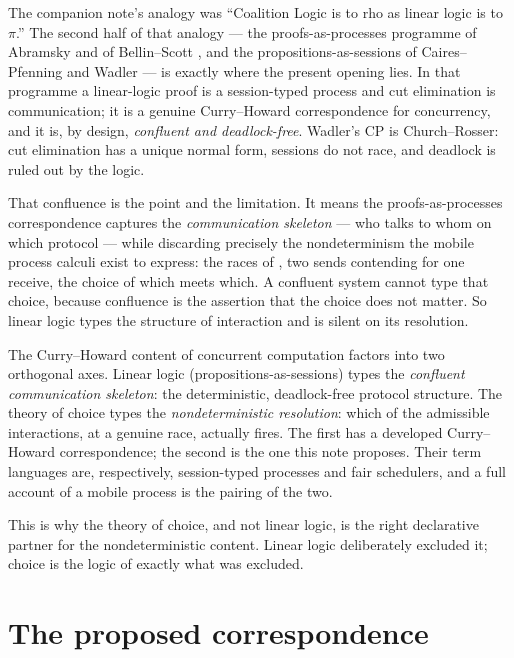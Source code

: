 The companion note's analogy was ``Coalition Logic is to rho as linear logic is to $\pi$.'' The second
half of that analogy --- the proofs-as-processes programme of Abramsky and of Bellin--Scott
\cite{abramskyPaP,bellinscott}, and the propositions-as-sessions of Caires--Pfenning and Wadler
\cite{cairespfenning,wadler} --- is exactly where the present opening lies. In that programme a
linear-logic proof is a session-typed process and cut elimination is communication; it is a genuine
Curry--Howard correspondence for concurrency, and it is, by design, \emph{confluent and deadlock-free}.
Wadler's CP is Church--Rosser: cut elimination has a unique normal form, sessions do not race, and
deadlock is ruled out by the logic.

That confluence is the point and the limitation. It means the proofs-as-processes correspondence captures
the \emph{communication skeleton} --- who talks to whom on which protocol --- while discarding precisely
the nondeterminism the mobile process calculi exist to express: the races of \chApr, two sends
contending for one receive, the choice of which meets which. A confluent system cannot type that choice,
because confluence is the assertion that the choice does not matter. So linear logic types the structure
of interaction and is silent on its resolution.

\begin{principle}\label{chs:prin:complement}
The Curry--Howard content of concurrent computation factors into two orthogonal axes. Linear logic
(propositions-as-sessions) types the \emph{confluent communication skeleton}: the deterministic,
deadlock-free protocol structure. The theory of choice types the \emph{nondeterministic resolution}:
which of the admissible interactions, at a genuine race, actually fires. The first has a developed
Curry--Howard correspondence; the second is the one this note proposes. Their term languages are,
respectively, session-typed processes and fair schedulers, and a full account of a mobile process is
the pairing of the two.
\end{principle}

\noindent
This is why the theory of choice, and not linear logic, is the right declarative partner for the
nondeterministic content. Linear logic deliberately excluded it; choice is the logic of exactly what
was excluded.

\section{The proposed correspondence}\label{chs:sec:corr}

